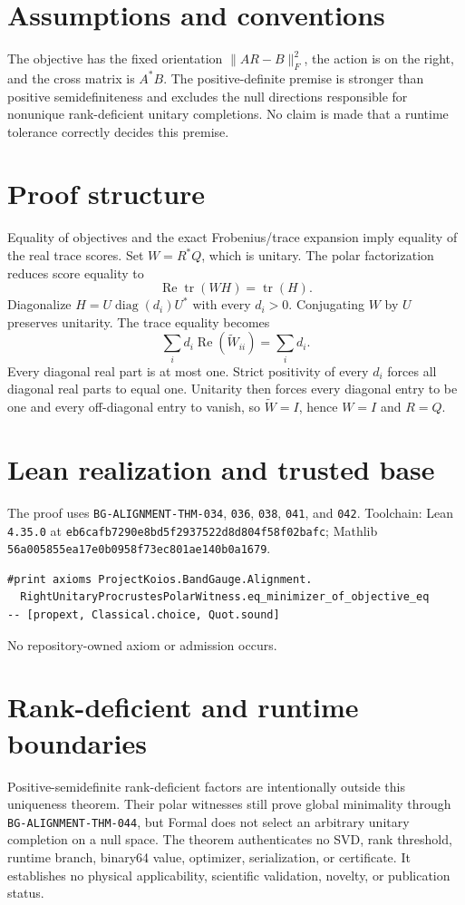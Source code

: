 \documentclass[10pt]{article}
\begin{document}
\section{Assumptions and conventions}
The objective has the fixed orientation $\lVert AR-B\rVert_F^2$, the action is on the right, and
the cross matrix is $A^*B$. The positive-definite premise is stronger than positive
semidefiniteness and excludes the null directions responsible for nonunique rank-deficient unitary
completions. No claim is made that a runtime tolerance correctly decides this premise.

\section{Proof structure}
Equality of objectives and the exact Frobenius/trace expansion imply equality of the real trace
scores. Set $W=R^*Q$, which is unitary. The polar factorization reduces score equality to
\[
  \operatorname{Re}\operatorname{tr}(WH)=\operatorname{tr}(H).
\]
Diagonalize $H=U\operatorname{diag}(d_i)U^*$ with every $d_i>0$. Conjugating $W$ by $U$ preserves
unitarity. The trace equality becomes
\[
  \sum_i d_i\operatorname{Re}(\widetilde W_{ii})=\sum_i d_i.
\]
Every diagonal real part is at most one. Strict positivity of every $d_i$ forces all diagonal real
parts to equal one. Unitarity then forces every diagonal entry to be one and every off-diagonal
entry to vanish, so $\widetilde W=I$, hence $W=I$ and $R=Q$.

\section{Lean realization and trusted base}
The proof uses \texttt{BG-ALIGNMENT-THM-034}, \texttt{036}, \texttt{038}, \texttt{041}, and
\texttt{042}. Toolchain: Lean \texttt{4.35.0} at
\texttt{eb6cafb7290e8bd5f2937522d8d804f58f02bafc}; Mathlib
\texttt{56a005855ea17e0b0958f73ec801ae140b0a1679}.
\begin{verbatim}
#print axioms ProjectKoios.BandGauge.Alignment.
  RightUnitaryProcrustesPolarWitness.eq_minimizer_of_objective_eq
-- [propext, Classical.choice, Quot.sound]
\end{verbatim}
No repository-owned axiom or admission occurs.

\section{Rank-deficient and runtime boundaries}
Positive-semidefinite rank-deficient factors are intentionally outside this uniqueness theorem.
Their polar witnesses still prove global minimality through \texttt{BG-ALIGNMENT-THM-044}, but
Formal does not select an arbitrary unitary completion on a null space. The theorem authenticates
no SVD, rank threshold, runtime branch, binary64 value, optimizer, serialization, or certificate.
It establishes no physical applicability, scientific validation, novelty, or publication status.
\end{document}

